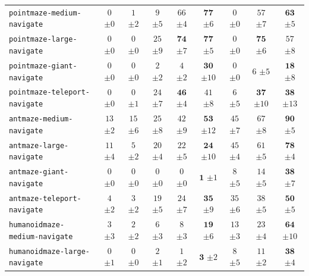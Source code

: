 \documentclass{article}
\begin{document}
\begin{table}[t!]
{\begin{tabular}{lcccccccc}
\texttt{pointmaze-medium-navigate} & $0$ {\tiny $\pm 0$} & $1$ {\tiny $\pm 2$} & $9$ {\tiny $\pm 5$} & $66$ {\tiny $\pm 4$} & $\mathbf{77}$ {\tiny $\pm 6$} & $0$ {\tiny $\pm 0$} & $57$ {\tiny $\pm 7$} & $\mathbf{63}$ {\tiny $\pm 5$} \\
\texttt{pointmaze-large-navigate} & $0$ {\tiny $\pm 0$} & $0$ {\tiny $\pm 0$} & $25$ {\tiny $\pm 9$} & $\mathbf{74}$ {\tiny $\pm 7$} & $\mathbf{77}$ {\tiny $\pm 5$} & $0$ {\tiny $\pm 0$} & $\mathbf{75}$ {\tiny $\pm 6$} & $57$ {\tiny $\pm 8$} \\
\texttt{pointmaze-giant-navigate} & $0$ {\tiny $\pm 0$} & $0$ {\tiny $\pm 0$} & $2$ {\tiny $\pm 2$} & $4$ {\tiny $\pm 2$} & $\mathbf{30}$ {\tiny $\pm 10$} & $0$ {\tiny $\pm 0$} & $6$ {\tiny $\pm 5$} & $\mathbf{18}$ {\tiny $\pm 8$} \\
\texttt{pointmaze-teleport-navigate} & $0$ {\tiny $\pm 0$} & $0$ {\tiny $\pm 1$} & $24$ {\tiny $\pm 7$} & $\mathbf{46}$ {\tiny $\pm 4$} & $41$ {\tiny $\pm 8$} & $6$ {\tiny $\pm 5$} & $\mathbf{37}$ {\tiny $\pm 10$} & $\mathbf{38}$ {\tiny $\pm 13$} \\
\texttt{antmaze-medium-navigate} & $13$ {\tiny $\pm 2$} & $15$ {\tiny $\pm 6$} & $25$ {\tiny $\pm 8$} & $42$ {\tiny $\pm 9$} & $\mathbf{53}$ {\tiny $\pm 12$} & $45$ {\tiny $\pm 7$} & $67$ {\tiny $\pm 8$} & $\mathbf{90}$ {\tiny $\pm 5$} \\
\texttt{antmaze-large-navigate} & $11$ {\tiny $\pm 4$} & $5$ {\tiny $\pm 2$} & $20$ {\tiny $\pm 4$} & $22$ {\tiny $\pm 5$} & $\mathbf{24}$ {\tiny $\pm 10$} & $45$ {\tiny $\pm 4$} & $61$ {\tiny $\pm 5$} & $\mathbf{78}$ {\tiny $\pm 4$} \\
\texttt{antmaze-giant-navigate} & $0$ {\tiny $\pm 0$} & $0$ {\tiny $\pm 0$} & $0$ {\tiny $\pm 0$} & $0$ {\tiny $\pm 0$} & $\mathbf{1}$ {\tiny $\pm 1$} & $8$ {\tiny $\pm 5$} & $14$ {\tiny $\pm 5$} & $\mathbf{38}$ {\tiny $\pm 7$} \\
\texttt{antmaze-teleport-navigate} & $4$ {\tiny $\pm 2$} & $3$ {\tiny $\pm 2$} & $19$ {\tiny $\pm 5$} & $24$ {\tiny $\pm 7$} & $\mathbf{35}$ {\tiny $\pm 9$} & $35$ {\tiny $\pm 6$} & $38$ {\tiny $\pm 5$} & $\mathbf{50}$ {\tiny $\pm 5$} \\
\texttt{humanoidmaze-medium-navigate} & $3$ {\tiny $\pm 3$} & $2$ {\tiny $\pm 2$} & $6$ {\tiny $\pm 3$} & $8$ {\tiny $\pm 3$} & $\mathbf{19}$ {\tiny $\pm 6$} & $13$ {\tiny $\pm 3$} & $23$ {\tiny $\pm 4$} & $\mathbf{64}$ {\tiny $\pm 10$} \\
\texttt{humanoidmaze-large-navigate} & $0$ {\tiny $\pm 1$} & $0$ {\tiny $\pm 0$} & $2$ {\tiny $\pm 1$} & $1$ {\tiny $\pm 2$} & $\mathbf{3}$ {\tiny $\pm 2$} & $8$ {\tiny $\pm 5$} & $11$ {\tiny $\pm 2$} & $\mathbf{38}$ {\tiny $\pm 4$} \\

\end{tabular}}
\end{table}
\end{document}
